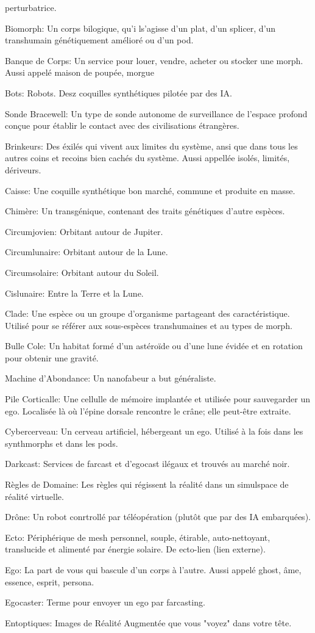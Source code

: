 perturbatrice. \item Biomorph: Un corps bilogique, qu'i ls'agisse d'un plat, d'un splicer, d'un transhumain génétiquement amélioré ou d'un pod. \item Banque de Corps: Un service pour louer, vendre, acheter  ou stocker une morph. Aussi appelé maison de poupée, morgue \item Bots: Robots. Desz coquilles synthétiques pilotée par des IA. \item Sonde Bracewell: Un type de sonde autonome de surveillance de l'espace profond conçue pour établir le contact avec des civilisations étrangères. \item Brinkeurs: Des éxilés qui vivent aux limites du système, ansi que dans tous les autres coins et recoins bien cachés du système. Aussi appellée isolés, limités, dériveurs. \item Caisse: Une coquille synthétique bon marché, commune et produite en masse. \item Chimère: Un transgénique, contenant des traits génétiques d'autre espèces. \item Circumjovien: Orbitant autour de Jupiter. \item Circumlunaire: Orbitant autour de la Lune. \item Circumsolaire: Orbitant autour du Soleil. \item Cislunaire: Entre la Terre et la Lune. \item Clade: Une espèce ou un groupe d'organisme partageant des caractéristique. Utilisé pour se référer aux sous-espèces transhumaines et au types de morph. \item Bulle Cole: Un habitat formé d'un astéroïde ou d'une lune évidée et en rotation pour obtenir une gravité. \item Machine d'Abondance: Un nanofabeur a but généraliste. \item Pile Corticalle: Une cellulle de mémoire implantée et utilisée pour sauvegarder un ego. Localisée là où l'épine dorsale rencontre le crâne; elle peut-être extraite. \item Cybercerveau: Un cerveau artificiel, hébergeant un ego. Utilisé à la fois dans les synthmorphs et dans les pods. \item Darkcast: Services de farcast et d'egocast ilégaux et trouvés au marché noir. \item Règles de Domaine: Les règles qui régissent la réalité dans un simulspace de réalité virtuelle. \item Drône: Un robot conrtrollé par téléopération (plutôt que par des IA embarquées). \item Ecto: Périphérique de mesh personnel, souple, étirable, auto-nettoyant, translucide et alimenté par énergie solaire. De ecto-lien (lien externe). \item Ego: La part de vous qui bascule d'un corps à l'autre. Aussi appelé ghost, âme, essence, esprit, persona. \item Egocaster: Terme pour envoyer un ego par farcasting. \item Entoptiques: Images de Réalité Augmentée que vous "voyez" dans votre tête. 